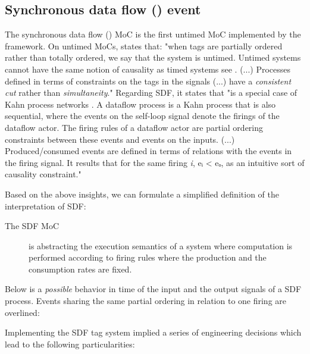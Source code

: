 \subsection{Synchronous data flow () event}
The synchronous data flow () MoC is the first untimed MoC
 implemented by the  framework. On untimed MoCs,
 \cite{Lee98} states that: "when tags are
 partially ordered rather than totally ordered, we say that the
 system is untimed. Untimed systems cannot have the same notion of
 causality as timed systems {}see . (...)
 Processes defined in terms of constraints on the tags in the
 signals (...) have a \emph{consistent cut} rather than
 \emph{simultaneity}."  Regarding SDF, it states that "is a special
 case of Kahn process networks
 \cite{Kahn76}. A dataflow process is a Kahn
 process that is also sequential, where the events on the
 self-loop signal denote the firings of the dataflow actor. The
 firing rules of a dataflow actor are partial ordering constraints
 between these events and events on the inputs. (...)
 Produced/consumed events are defined in terms of relations with
 the events in the firing signal. It results that for the same
 firing \emph{i}, eᵢ < eₒ, as an intuitive sort of
 causality constraint."\par
Based on the above insights, we can formulate a simplified
 definition of the  interpretation of SDF:\par
\begin{description}
\item[The SDF MoC] is abstracting the execution semantics of a system
 where computation is performed according to firing rules where
 the production and the consumption rates are fixed.
\end{description}Below is a \emph{possible} behavior in time of the input and the
 output signals of a SDF process. Events sharing the same partial
 ordering in relation to one firing are overlined:\par
                 \par
                 Implementing the SDF tag system implied a series of engineering
 decisions which lead to the following particularities:\par
